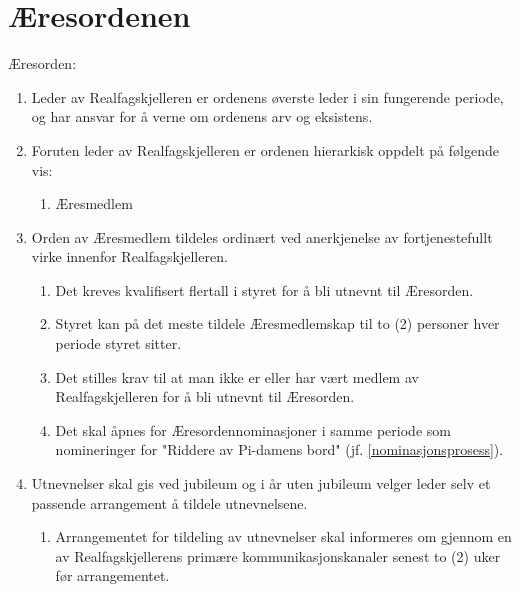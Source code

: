 \section{Æresordenen} \label{æresordenen}
Æresorden:
\begin{enumerate}
    \item Leder av Realfagskjelleren er ordenens øverste leder i sin fungerende periode, og har ansvar for å verne om ordenens arv og eksistens.
    \item Foruten leder av Realfagskjelleren er ordenen hierarkisk oppdelt på følgende vis:
        \begin{enumerate}[1.]
            \item Æresmedlem
        \end{enumerate}
    \item Orden av Æresmedlem tildeles ordinært ved anerkjenelse av fortjenestefullt virke innenfor Realfagskjelleren.
        \begin{enumerate}[1.]
            \item Det kreves kvalifisert flertall i styret for å bli utnevnt til Æresorden.
            \item Styret kan på det meste tildele Æresmedlemskap til to (2) personer hver periode styret sitter.
            \item Det stilles krav til at man ikke er eller har vært medlem av Realfagskjelleren for å bli utnevnt til Æresorden.
            \item Det skal åpnes for Æresordennominasjoner i samme periode som nomineringer for "Riddere av Pi-damens bord" (jf. \ref{nominasjonsprosess}).
        \end{enumerate}
    \item Utnevnelser skal gis ved jubileum og i år uten jubileum velger leder selv et passende arrangement å tildele utnevnelsene.
    \begin{enumerate}
        \item Arrangementet for tildeling av utnevnelser skal informeres om gjennom en av Realfagskjellerens primære kommunikasjonskanaler senest to (2) uker før arrangementet.
    \end{enumerate}
\end{enumerate}